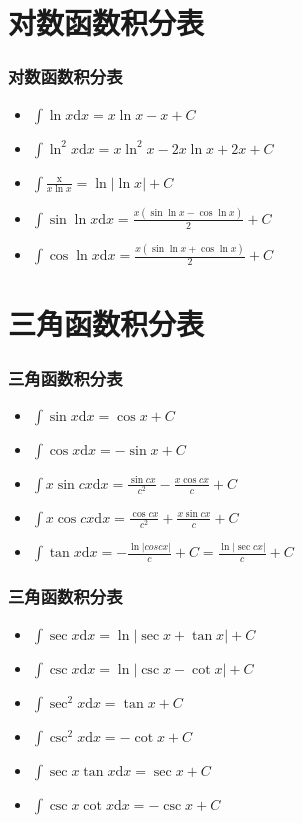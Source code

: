 \documentclass[UTF8, aspectratio = 169, fontsize = 12, hyperref]{ctexbeamer}
\begin{document}
    \section{对数函数积分表}
    \begin{frame}
        \frametitle{对数函数积分表}
        \begin{itemize}
            \item $\int{\ln{x}}\mathrm{d}x=x\ln{x}-x+C$
            \item $\int{\ln^2{x}}\mathrm{d}x=x\ln^2{x}-2x\ln{x}+2x+C$
            \item $\int{\frac{\mathrm{x}}{x\ln{x}}}=\ln{|\ln{x}|}+C$
            \item $\int{\sin{\ln{x}}}\mathrm{d}x=\frac{x(\sin{\ln{x}}-\cos{\ln{x}})}{2}+C$
            \item $\int{\cos{\ln{x}}}\mathrm{d}x=\frac{x(\sin{\ln{x}}+\cos{\ln{x}})}{2}+C$
        \end{itemize}
    \end{frame}
    \section{三角函数积分表}
    \begin{frame}
        \frametitle{三角函数积分表}
        \begin{itemize}
            \item $\int{\sin{x}}\mathrm{d}x=\cos{x}+C$
            \item $\int{\cos{x}}\mathrm{d}x=-\sin{x}+C$
            \item $\int{x\sin{cx}}\mathrm{d}x=\frac{\sin{cx}}{c^2}-\frac{x\cos{cx}}{c}+C$
            \item $\int{x\cos{cx}}\mathrm{d}x=\frac{\cos{cx}}{c^2}+\frac{x\sin{cx}}{c}+C$
            \item $\int{\tan{x}}\mathrm{d}x=-\frac{\ln{|cos{cx}|}}{c}+C=\frac{\ln{|\sec{cx}|}}{c}+C$
        \end{itemize}
    \end{frame}
    \begin{frame}
        \frametitle{三角函数积分表}
        \begin{itemize}
            \item $\int{\sec{x}}\mathrm{d}x=\ln{|\sec{x}+\tan{x}|}+C$
            \item $\int{\csc{x}}\mathrm{d}x=\ln{|\csc{x}-\cot{x}|}+C$
            \item $\int{\sec^2{x}}\mathrm{d}x=\tan{x}+C$
            \item $\int{\csc^2{x}}\mathrm{d}x=-\cot{x}+C$
            \item $\int{\sec{x}\tan{x}}\mathrm{d}x=\sec{x}+C$
            \item $\int{\csc{x}\cot{x}}\mathrm{d}x=-\csc{x}+C$
        \end{itemize}
    \end{frame}
\end{document}
